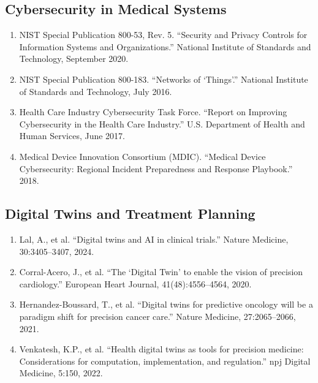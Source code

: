 \subsection*{Cybersecurity in Medical Systems}

\begin{enumerate}[resume]
\item NIST Special Publication 800-53, Rev. 5. ``Security and Privacy Controls for Information Systems and Organizations.'' National Institute of Standards and Technology, September 2020.

\item NIST Special Publication 800-183. ``Networks of `Things'.'' National Institute of Standards and Technology, July 2016.

\item Health Care Industry Cybersecurity Task Force. ``Report on Improving Cybersecurity in the Health Care Industry.'' U.S. Department of Health and Human Services, June 2017.

\item Medical Device Innovation Consortium (MDIC). ``Medical Device Cybersecurity: Regional Incident Preparedness and Response Playbook.'' 2018.
\end{enumerate}

\subsection*{Digital Twins and Treatment Planning}

\begin{enumerate}[resume]
\item Lal, A., et al. ``Digital twins and AI in clinical trials.'' Nature Medicine, 30:3405--3407, 2024.

\item Corral-Acero, J., et al. ``The `Digital Twin' to enable the vision of precision cardiology.'' European Heart Journal, 41(48):4556--4564, 2020.

\item Hernandez-Boussard, T., et al. ``Digital twins for predictive oncology will be a paradigm shift for precision cancer care.'' Nature Medicine, 27:2065--2066, 2021.

\item Venkatesh, K.P., et al. ``Health digital twins as tools for precision medicine: Considerations for computation, implementation, and regulation.'' npj Digital Medicine, 5:150, 2022.
\end{enumerate}

